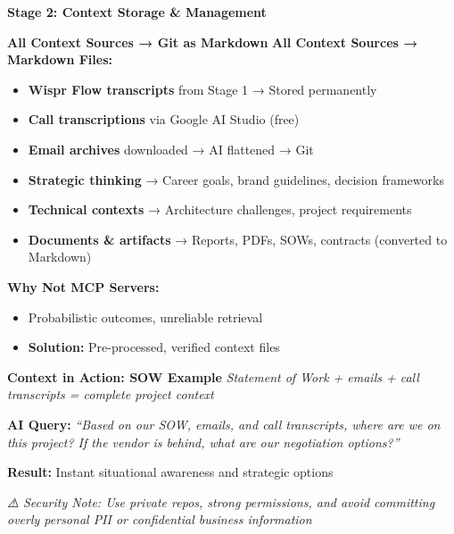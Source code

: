 \documentclass[
  ignorenonframetext,
  aspectratio=169,
]{beamer}
\providecommand{\tightlist}{%
  \setlength{\itemsep}{0pt}\setlength{\parskip}{0pt}}
\begin{document}
\begin{frame}{\textbf{Stage 2: Context Storage \& Management}}
\label{stage-2-context-storage-management}
\begin{block}{\textbf{All Context Sources → Git as Markdown}}
\label{all-context-sources-git-as-markdown}
\textbf{All Context Sources → Markdown Files:}

\begin{itemize}
\tightlist
\item
  \textbf{Wispr Flow transcripts} from Stage 1 → Stored permanently
\item
  \textbf{Call transcriptions} via Google AI Studio (free)
\item
  \textbf{Email archives} downloaded → AI flattened → Git
\item
  \textbf{Strategic thinking} → Career goals, brand guidelines, decision
  frameworks
\item
  \textbf{Technical contexts} → Architecture challenges, project
  requirements
\item
  \textbf{Documents \& artifacts} → Reports, PDFs, SOWs, contracts
  (converted to Markdown)
\end{itemize}

\textbf{Why Not MCP Servers:}

\begin{itemize}
\tightlist
\item
  Probabilistic outcomes, unreliable retrieval
\item
  \textbf{Solution:} Pre-processed, verified context files
\end{itemize}
\end{block}
\end{frame}

\begin{frame}
\begin{block}{\textbf{Context in Action: SOW Example}}
\label{context-in-action-sow-example}
\emph{Statement of Work + emails + call transcripts = complete project
context}

\textbf{AI Query:} \emph{``Based on our SOW, emails, and call
transcripts, where are we on this project? If the vendor is behind, what
are our negotiation options?''}

\textbf{Result:} Instant situational awareness and strategic options
\end{block}
\end{frame}

\begin{frame}
\emph{⚠️ Security Note: Use private repos, strong permissions, and avoid
committing overly personal PII or confidential business information}
\end{frame}
\end{document}

